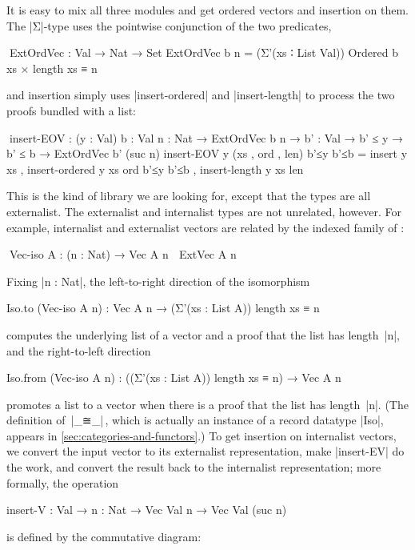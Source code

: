 It is easy to mix all three modules and get ordered vectors and insertion on them.
The |Σ|-type uses the pointwise conjunction of the two predicates,
\begin{code}
^^^ExtOrdVec : Val → Nat → Set
ExtOrdVec b n = (Σ'(xs ∶ List Val)) Ordered b xs × length xs ≡ n
\end{code}
and insertion simply uses |insert-ordered| and |insert-length| to process the two proofs bundled with a list:
\begin{code}
^^^insert-EOV :  (y : Val) {b : Val} {n : Nat} → ExtOrdVec b n →
                 {b' : Val} → b' ≤ y → b' ≤ b → ExtOrdVec b' (suc n)
insert-EOV y (xs , ord , len) b'≤y b'≤b =  insert          y xs ,
                                           insert-ordered  y xs ord b'≤y b'≤b ,
                                           insert-length   y xs len
\end{code}
This is the kind of library we are looking for, except that the types are all externalist.
The externalist and internalist types are not unrelated, however.
For example, internalist and externalist vectors are related by the indexed family of :
\begin{code}
^^^Vec-iso A : (n : Nat) → Vec A n ≅ ExtVec A n
\end{code}
Fixing |n : Nat|, the left-to-right direction of the isomorphism
\begin{code}
Iso.to (Vec-iso A n) : Vec A n → (Σ'(xs : List A)) length xs ≡ n
\end{code}
computes the underlying list of a vector and a proof that the list has length~|n|, and the right-to-left direction
\begin{code}
Iso.from (Vec-iso A n) : ((Σ'(xs : List A)) length xs ≡ n) → Vec A n
\end{code}
promotes a list to a vector when there is a proof that the list has length~|n|.
(The definition of~|_≅_|\,, which is actually an instance of a record datatype |Iso|, appears in \autoref{sec:categories-and-functors}.)
To get insertion on internalist vectors, we convert the input vector to its externalist representation, make |insert-EV| do the work, and convert the result back to the internalist representation; more formally, the operation
\begin{code}
insert-V : Val → {n : Nat} → Vec Val n → Vec Val (suc n)
\end{code}
is defined by the commutative diagram:
